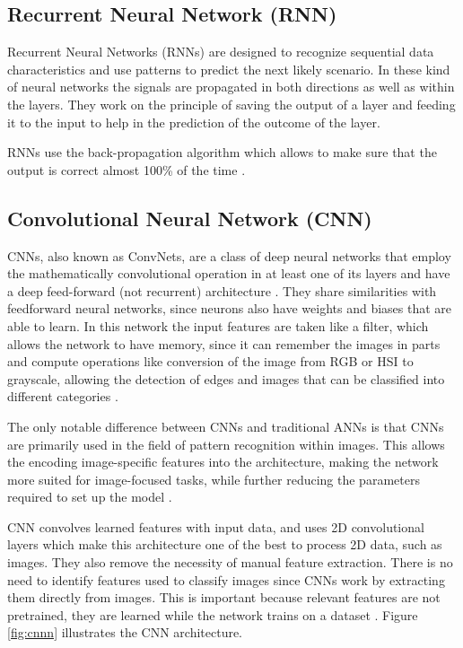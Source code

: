             \subsection{Recurrent Neural Network (RNN)} 

            \par Recurrent Neural Networks (RNNs) are designed to recognize sequential data characteristics and use patterns to predict the next likely scenario. In these kind of neural networks the signals are propagated in both directions as well as within the layers. They work on the principle of saving the output of a layer and feeding it to the input to help in the prediction of the outcome of the layer.
            \par RNNs use the back-propagation algorithm which allows to make sure that the output is correct almost 100\% of the time \cite{ArmaanMerchant2018}.
        


            \subsection{Convolutional Neural Network (CNN)}
            
            \par CNNs, also known as ConvNets, are a class of deep neural networks that employ the mathematically convolutional operation in at least one of its layers and have a deep feed-forward (not recurrent) architecture \cite{Ribeiro}. They share similarities with feedforward neural networks, since neurons also have weights and biases that are able to learn. In this network the input features are taken like a filter, which allows the network to have memory, since it can remember the images in parts and compute operations like conversion of the image from RGB or HSI to grayscale, allowing the detection of edges and images that can be classified into different categories \cite{ArmaanMerchant2018}. 

            \par The only notable difference between CNNs and traditional ANNs is that CNNs are primarily used in the field of pattern recognition within images. This allows the encoding image-specific features into the architecture, making the network more suited for image-focused tasks, while further reducing the parameters required to set up the model \cite{OShea2015}.
            
            

            \par CNN convolves learned features with input data, and uses 2D convolutional layers which make this architecture one of the best to process 2D data, such as images. They also remove the necessity of manual feature extraction. There is no need to identify features used to classify images since CNNs work by extracting them directly from images. This is important because relevant features are not pretrained, they are learned while the network trains on a dataset \cite{mathworks_deeplearning}. Figure \ref{fig:cnnn} illustrates the CNN architecture.

